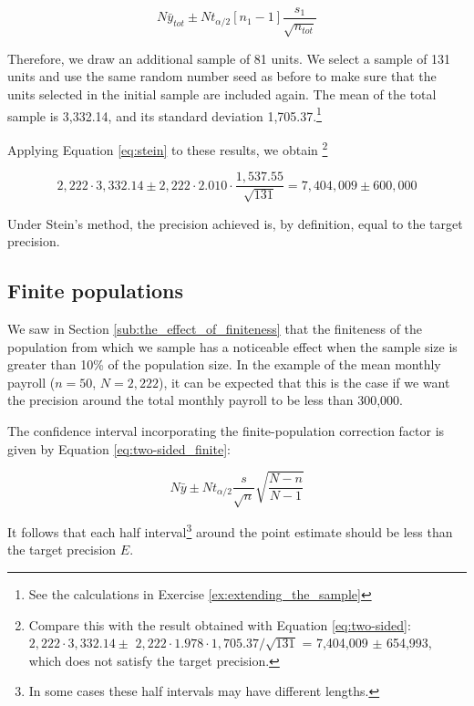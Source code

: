 \begin{equation}
  N \bar{y}_{tot} \pm N t_{\alpha/2}[n_1-1] \frac{s_1}{\sqrt{n_{tot}}}
  \label{eq:stein}
\end{equation}

Therefore, we draw an additional sample of 81 units. We select a sample of 131 units and use the same random number seed as before to make sure that the units selected in the initial sample are included again.
The mean of the total sample is 3,332.14, and its standard deviation 1,705.37.\footnote{See the calculations in Exercise \ref{ex:extending_the_sample}}

Applying Equation \ref{eq:stein} to these results, we obtain 
\footnote{Compare this with the result obtained with Equation \ref{eq:two-sided}: $2,222 \cdot 3,332.14 \pm$ $2,222 \cdot1.978 \cdot 1,705.37 / \sqrt{131}$ = 7,404,009 $\pm$ 654,993, which does not satisfy the target precision.}

\begin{equation*}
  2,222 \cdot 3,332.14 \pm 2,222 \cdot 2.010 \cdot \frac{1,537.55}{\sqrt{131}} = 7,404,009 \pm 600,000
\end{equation*}

Under Stein's method, the precision achieved is, by definition, equal to the target precision.


\subsection{Finite populations} %
\label{sub:finite_populations}

We saw in Section \ref{sub:the_effect_of_finiteness} that the finiteness of the population from which we sample has a noticeable effect when the sample size is greater than 10\% of the population size. In the example of the mean monthly payroll ($n = 50$, $N = 2,222$), it can be expected that this is the case if we want the precision around the total monthly payroll to be less than 300,000.

The confidence interval incorporating the finite-population correction factor is given by Equation \ref{eq:two-sided_finite}:

\begin{equation*}
N \bar{y} \pm N t_{\alpha/2} \frac{s}{\sqrt{n}}\sqrt{\frac{N-n}{N-1}}
\end{equation*}

It follows that each half interval\footnote{In some cases these half intervals may have different lengths.} around the point estimate should be less than the target precision $E$.

